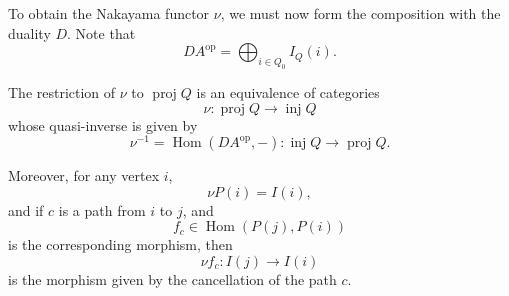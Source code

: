\documentclass[11pt, a4paper]{report}
\begin{document}
                To obtain the Nakayama functor $\nu$, we must now form the composition with the
                duality $D$. Note that
                \[
                DA^{\operatorname{op}}=\bigoplus_{i\in Q_0} I_Q(i).
                \]

                \begin{proposition}
                    The restriction of $\nu$ to $\operatorname{proj} Q$ is an equivalence of categories
                    \[
                    \nu \colon \operatorname{proj} Q \longrightarrow \operatorname{inj} Q
                    \]
                    whose quasi-inverse is given by
                    \[
                    \nu^{-1}=\operatorname{Hom}(DA^{\operatorname{op}},-)\colon \operatorname{inj} Q \longrightarrow \operatorname{proj} Q.
                    \]

                    Moreover, for any vertex $i$,
                    \[
                    \nu P(i)=I(i),
                    \]
                    and if $c$ is a path from $i$ to $j$, and
                    \[
                    f_c\in \operatorname{Hom}(P(j),P(i))
                    \]
                    is the corresponding morphism, then
                    \[
                    \nu f_c\colon I(j)\to I(i)
                    \]
                    is the morphism given by the cancellation of the path $c$.
                    \end{proposition}
\end{document}
